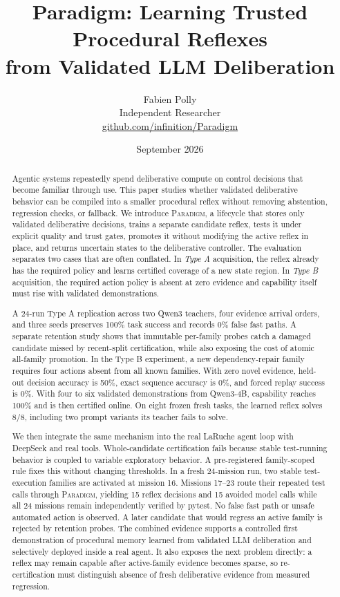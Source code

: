\documentclass[10pt]{article}
\title{\vspace{-1.5em}\textbf{Paradigm: Learning Trusted Procedural Reflexes\\from Validated LLM Deliberation}}
\author{Fabien Polly\\Independent Researcher\\\href{https://github.com/infinition/Paradigm}{github.com/infinition/Paradigm}}
\date{September 2026}
\newcommand{\paradigm}{\textsc{Paradigm}}
\begin{document}
\maketitle
\vspace{-1.2em}

\begin{abstract}
Agentic systems repeatedly spend deliberative compute on control decisions that become familiar through use. This paper studies whether validated deliberative behavior can be compiled into a smaller procedural reflex without removing abstention, regression checks, or fallback. We introduce \paradigm, a lifecycle that stores only validated deliberative decisions, trains a separate candidate reflex, tests it under explicit quality and trust gates, promotes it without modifying the active reflex in place, and returns uncertain states to the deliberative controller. The evaluation separates two cases that are often conflated. In \emph{Type A} acquisition, the reflex already has the required policy and learns certified coverage of a new state region. In \emph{Type B} acquisition, the required action policy is absent at zero evidence and capability itself must rise with validated demonstrations.

A 24-run Type A replication across two Qwen3 teachers, four evidence arrival orders, and three seeds preserves 100\% task success and records 0\% false fast paths. A separate retention study shows that immutable per-family probes catch a damaged candidate missed by recent-split certification, while also exposing the cost of atomic all-family promotion. In the Type B experiment, a new dependency-repair family requires four actions absent from all known families. With zero novel evidence, held-out decision accuracy is 50\%, exact sequence accuracy is 0\%, and forced replay success is 0\%. With four to six validated demonstrations from Qwen3-4B, capability reaches 100\% and is then certified online. On eight frozen fresh tasks, the learned reflex solves 8/8, including two prompt variants its teacher fails to solve.

We then integrate the same mechanism into the real LaRuche agent loop with DeepSeek and real tools. Whole-candidate certification fails because stable test-running behavior is coupled to variable exploratory behavior. A pre-registered family-scoped rule fixes this without changing thresholds. In a fresh 24-mission run, two stable test-execution families are activated at mission 16. Missions 17--23 route their repeated test calls through \paradigm, yielding 15 reflex decisions and 15 avoided model calls while all 24 missions remain independently verified by pytest. No false fast path or unsafe automated action is observed. A later candidate that would regress an active family is rejected by retention probes. The combined evidence supports a controlled first demonstration of procedural memory learned from validated LLM deliberation and selectively deployed inside a real agent. It also exposes the next problem directly: a reflex may remain capable after active-family evidence becomes sparse, so re-certification must distinguish absence of fresh deliberative evidence from measured regression.
\end{abstract}
\end{document}
